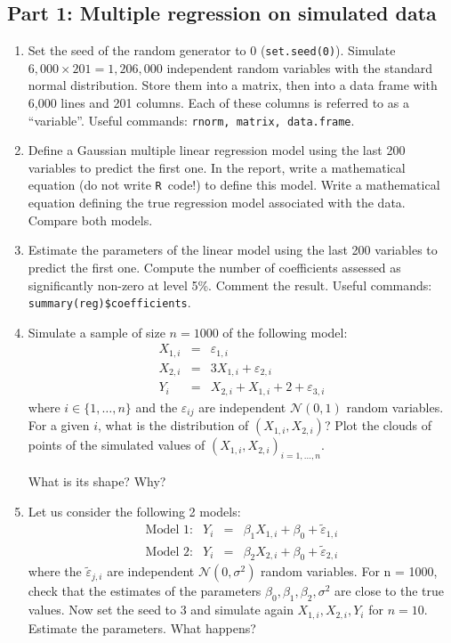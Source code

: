 \documentclass[12pt,a4paper]{article}
\newcommand{\R}{\texttt{R}~}
\newcommand{\code}[1]{\texttt{#1}}
\begin{document}
\subsection*{Part 1: Multiple regression on simulated data}
\begin{enumerate}
\item Set the seed of the random generator to 0 (\code{set.seed(0)}). Simulate $6,000 \times 201 = 1,206,000$ independent random variables with the standard normal distribution. Store them into a matrix, then into a data frame with 6,000 lines and 201 columns. Each of these columns is referred to as a ``variable''. Useful commands: \code{rnorm, matrix, data.frame}.
\item Define a Gaussian multiple linear regression model using the last 200 variables to predict the first one. In the report, write a mathematical equation (do not write \R code!) to define this model. Write a mathematical equation defining the true regression model associated with the data. Compare both models.
\item Estimate the parameters of the linear model using the last 200 variables to predict the first one. Compute the number of coefficients assessed as significantly non-zero at level 5\%. Comment the result. Useful commands: \code{summary(reg)\$coefficients}.
\item Simulate a sample of size $n = 1000$ of the following model:
\begin{equation*}
\begin{array}{rcl}
X_{1,i} &=& \varepsilon_{1,i} \\
X_{2,i} &=& 3X_{1,i} + \varepsilon_{2,i} \\
Y_{i} &=& X_{2,i} + X_{1,i} + 2 + \varepsilon_{3,i}
\end{array}
\end{equation*}
where $i \in \{1,\dots, n\}$ and the $\varepsilon_{ij}$ are independent $\mathcal{N}(0,1)$ random variables. For a given $i$, what is the distribution of $(X_{1,i}, X_{2,i})$? Plot the clouds of points of the simulated values of $(X_{1,i}, X_{2,i})_{i=1, \dots, n}$. 

What is its shape? Why?

\item Let us consider the following 2 models:
\begin{equation*}
\begin{array}{rrcl}
\text{Model 1:} & Y_i & = & \beta_1 X_{1,i} + \beta_0 + \tilde{\varepsilon}_{1,i} \\
\text{Model 2:} & Y_i & = & \beta_2 X_{2,i} + \beta_0 + \tilde{\varepsilon}_{2,i}
\end{array}
\end{equation*}
where the $\tilde{\varepsilon}_{j,i}$ are independent $\mathcal{N}(0, \sigma^2)$ random variables. For n = 1000, check that the estimates of the parameters $\beta_0, \beta_1, \beta_2, \sigma^2$ are close to the true values. Now set the seed to 3 and simulate again $X_{1,i}, X_{2,i}, Y_i$ for $n = 10$. Estimate the parameters. What happens?


\end{enumerate}
\end{document}
